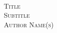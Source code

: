 \begin{titlepage}
	\pagestyle{empty} %
	\begin{center}
		\textsc{}\\[5cm]
		\textsc{\Large Title}\\[2.5cm]
		\textsc{\Large Subtitle}\\[0.5cm]
		\textsc{Author Name(s)}\\[0.5cm]
	\end{center}
\end{titlepage}

